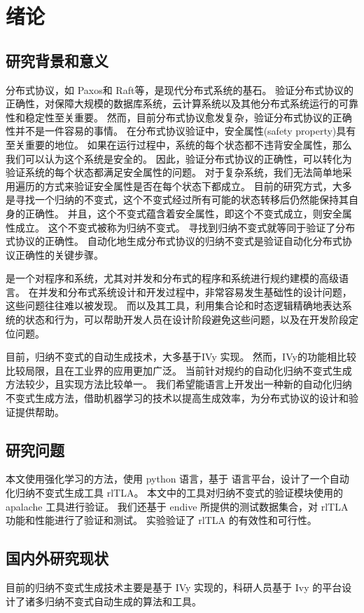\chapter{绪论}

\section{研究背景和意义}
分布式协议，如 Paxos和 Raft等，是现代分布式系统的基石。
验证分布式协议的正确性，对保障大规模的数据库系统，云计算系统以及其他分布式系统运行的可靠性和稳定性至关重要。
然而，目前分布式协议愈发复杂，验证分布式协议的正确性并不是一件容易的事情。
在分布式协议验证中，安全属性(safety property)具有至关重要的地位。
如果在运行过程中，系统的每个状态都不违背安全属性，那么我们可以认为这个系统是安全的。
因此，验证分布式协议的正确性，可以转化为验证系统的每个状态都满足安全属性的问题。
对于复杂系统，我们无法简单地采用遍历的方式来验证安全属性是否在每个状态下都成立。
目前的研究方式，大多是寻找一个归纳的不变式，这个不变式经过所有可能的状态转移后仍然能保持其自身的正确性。
并且，这个不变式蕴含着安全属性，即这个不变式成立，则安全属性成立。
这个不变式被称为归纳不变式\cite{inductive}。
寻找到归纳不变式就等同于验证了分布式协议的正确性。\cite{towards}
自动化地生成分布式协议的归纳不变式是验证自动化分布式协议正确性的关键步骤。

\TLA \cite{TLA+}是一个对程序和系统，尤其对并发和分布式的程序和系统进行规约建模的高级语言。
在并发和分布式系统设计和开发过程中，非常容易发生基础性的设计问题，这些问题往往难以被发现。
而\TLA 以及其工具，利用集合论和时态逻辑精确地表达系统的状态和行为，可以帮助开发人员在设计阶段避免这些问题，以及在开发阶段定位问题。

目前，归纳不变式的自动生成技术，大多基于IVy \cite{Ivy} 实现。
然而，IVy的功能相比较\TLA 比较局限，且\TLA 在工业界的应用更加广泛。
当前针对\TLA 规约的自动化归纳不变式生成方法较少，且实现方法比较单一。
我们希望能\TLA 语言上开发出一种新的自动化归纳不变式生成方法，借助机器学习的技术以提高生成效率，为分布式协议的设计和验证提供帮助。

\section{研究问题}
本文使用强化学习的方法，使用 python 语言，基于 \TLA 语言平台，设计了一个自动化归纳不变式生成工具 rlTLA。
本文中的工具对归纳不变式的验证模块使用的 apalache 工具进行验证。
我们还基于 endive 所提供的测试数据集合，对 rlTLA 功能和性能进行了验证和测试。
实验验证了 rlTLA 的有效性和可行性。

\section{国内外研究现状}
目前的归纳不变式生成技术主要是基于 IVy 实现的，科研人员基于 Ivy 的平台设计了诸多归纳不变式自动生成的算法和工具。

